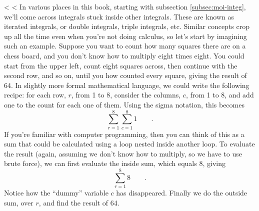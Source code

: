 <%
<%
In various places in this book, starting with subsection \ref{subsec:moi-integ},
we'll come across integrals stuck inside other integrals. These are known as
iterated integrals, or double integrals, triple integrals, etc. Similar concepts
crop up all the time even when you're not doing calculus, so let's start by
imagining such an example. Suppose you want to count how many squares there are
on a chess board, and you don't know how to multiply eight times eight. You
could start from the upper left, count eight squares across, then continue with
the second row, and so on, until you how counted every square, giving the result
of 64. In slightly more formal mathematical language, we could write the following
recipe: for each row, $r$, from 1 to 8, consider the columns, $c$, from 1 to 8,
and add one to the count for each one of them. Using the sigma notation, this
becomes
\begin{equation*}
  \sum_{r=1}^8 \sum_{c=1}^8 1 \qquad .
\end{equation*}
If you're familiar with computer programming, then you can think of this as
a sum that could be calculated using a loop nested inside another loop.
To evaluate the result (again, assuming we don't know how to multiply, so we
have to use brute force), we can first evaluate the inside sum, which equals
8, giving
\begin{equation*}
  \sum_{r=1}^8 8 \qquad .
\end{equation*}
Notice how the ``dummy'' variable $c$ has disappeared. Finally we do the outside
sum, over $r$, and find the result of 64.

